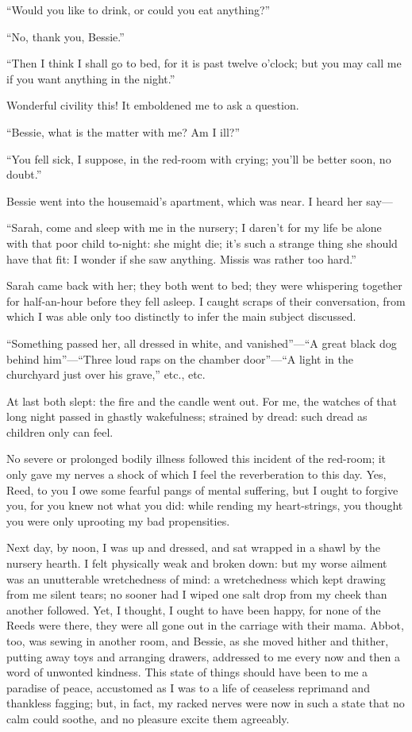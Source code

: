 \enquote{Would you like to drink, or could you eat anything?}

\enquote{No, thank you, Bessie.}

\enquote{Then I think I shall go to bed, for it is past twelve o'clock;
	but you may call me if you want anything in the night.}

Wonderful civility this!  It emboldened me to ask a question.

\enquote{Bessie, what is the matter with me?  Am I ill?}

\enquote{You fell sick, I suppose, in the red-room with crying; you'll
	be better soon, no doubt.}

Bessie went into the housemaid's apartment, which was near.  I heard her
say---

\enquote{Sarah, come and sleep with me in the nursery; I daren't for my
	life be alone with that poor child to-night: she might die; it's such a
	strange thing she should have that fit: I wonder if she saw anything.
	Missis was rather too hard.}

Sarah came back with her; they both went to bed; they were whispering
together for half-an-hour before they fell asleep.  I caught scraps of
their conversation, from which I was able only too distinctly to infer
the main subject discussed.

\enquote{Something passed her, all dressed in white, and
	vanished}---\enquote{A great black dog behind him}---\enquote{Three loud
	raps on the chamber door}---\enquote{A light in the churchyard just over
	his grave,} etc., etc.

At last both slept: the fire and the candle went out.  For me, the
watches of that long night passed in ghastly wakefulness; strained by
dread: such dread as children only can feel.

No severe or prolonged bodily illness followed this incident of the
red-room; it only gave my nerves a shock of which I feel the
reverberation to this day.  Yes, \Mrs{} Reed, to you I owe some fearful
pangs of mental suffering, but I ought to forgive you, for you knew not
what you did: while rending my heart-strings, you thought you were only
uprooting my bad propensities.

Next day, by noon, I was up and dressed, and sat wrapped in a shawl by
the nursery hearth.  I felt physically weak and broken down: but my
worse ailment was an unutterable wretchedness of mind: a wretchedness
which kept drawing from me silent tears; no sooner had I wiped one salt
drop from my cheek than another followed.  Yet, I thought, I ought to
have been happy, for none of the Reeds were there, they were all gone
out in the carriage with their mama.  Abbot, too, was sewing in another
room, and Bessie, as she moved hither and thither, putting away toys and
arranging drawers, addressed to me every now and then a word of unwonted
kindness.  This state of things should have been to me a paradise of
peace, accustomed as I was to a life of ceaseless reprimand and
thankless fagging; but, in fact, my racked nerves were now in such a
state that no calm could soothe, and no pleasure excite them agreeably.

